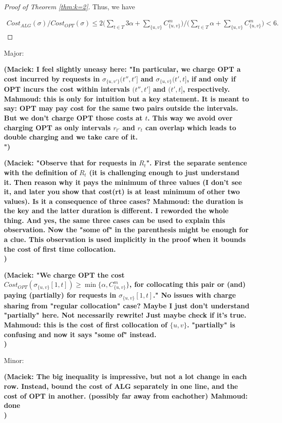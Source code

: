 \documentclass[manuscript,screen=true, review, anonymous]{acmart}
\newcommand\mahmoud[1]{\color{orange}\textbf{Mahmoud: #1}\\\color{black}}
\newcommand\maciek[1]{\color{brown}\textbf{(Maciek: #1)}\color{black}}
\begin{document}
\begin{proof}[Proof of Theorem \ref{thm:k=2}]
Thus, we have

\begin{align*}
	\mathit{Cost}_{\mathit{ALG}} (\sigma)	/
	\mathit{Cost}_{\mathit{OPT}} (\sigma)
	\leq
	2\Big(
	\sum_{ t \in T} 3\alpha +
	\sum_{\{u,v\}} C^{m}_{\{u,v\}}
	\Big)	 \big /
	\Big(
	\sum_{ t \in T} \alpha  
	+ \sum_{\{u,v\}} C^{m}_{\{u,v\}}  
	\Big)	< 6.
\end{align*}

\end{proof}

Major:

\maciek{I feel slightly uneasy here: "In particular,
we charge OPT a cost incurred by requests in
$\sigma_{\{u,v'\}}(t'',t']$ and $\sigma_{\{u,v\}}(t',t]$,
if and only if  OPT incurs the cost within  intervals $(t'', t']$ and $(t', t]$,
respectively.
\mahmoud{this is only for intuition but a key statement. It is meant to say: OPT may pay cost for the same two pairs outside the intervals. But we don't charge OPT  those costs at $t$. This way we avoid over charging OPT as only intervals $r_{t'}$ and $r_t$ can overlap which leads to double charging and we take care of it.}
"}

\maciek{"Observe that for requests in $R_t$". First the separate sentence with the definition of $R_t$ (it is challenging enough to just understand it. Then reason why it pays the minimum of three values (I don't see it, and later you show that cost(rt) is at least minimum of other two values). Is it a consequence of three cases? \mahmoud{the duration is the key and the latter duration is different. I reworded the whole thing. And yes, the same three cases can be used to explain this observation. Now the "some of" in the parenthesis might be enough for a clue. This observation is  used implicitly in the proof when it bounds the cost of first time collocation.}}

\maciek{"We charge OPT the cost
$\mathit{Cost}_{\mathit{OPT}} (\sigma_{\{u,v\}}[1,t]) 
\geq \min{ \{ \alpha, C^{m}_{ \{u,v\} } \} }$,
for collocating this pair or (and) paying (partially) for requests in $\sigma_{\{u,v\}}[1,t]$." No issues with charge sharing from "regular collocation" case? Maybe I just don't understand "partially" here. Not necessarily rewrite! Just maybe check if it's true.
\mahmoud{this is the cost of first collocation of $\{u,v\}$. "partially" is confusing and now it says "some of" instead.}}

Minor:

\maciek{The big inequality is impressive, but not a lot change in each row. Instead, bound the cost of ALG separately in one line, and the cost of OPT in another. (possibly far away from eachother) \mahmoud{done}}
\end{document}
